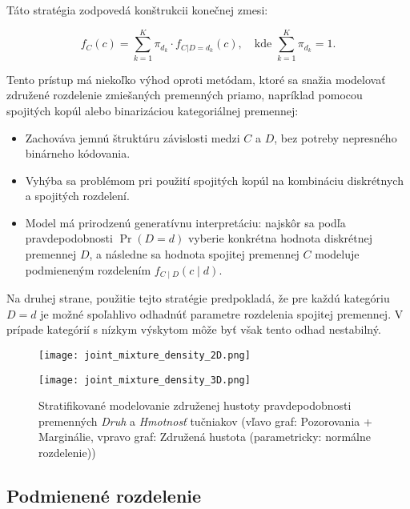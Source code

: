 Táto stratégia zodpovedá konštrukcii konečnej zmesi:

\begin{equation}
f_C(c) = \sum_{k=1}^{K} \pi_{d_k} \cdot f_{C|D=d_k}(c), \quad \text{kde } \sum_{k=1}^{K} \pi_{d_k} = 1.
\end{equation}

Tento prístup má niekoľko výhod oproti metódam, ktoré sa snažia modelovať združené rozdelenie zmiešaných premenných priamo, napríklad pomocou spojitých kopúl alebo binarizáciou kategoriálnej premennej:
\begin{itemize}
  \item Zachováva jemnú štruktúru závislosti medzi $C$ a $D$, bez potreby nepresného binárneho kódovania.
  \item Vyhýba sa problémom pri použití spojitých kopúl na kombináciu diskrétnych a spojitých rozdelení.
  \item Model má prirodzenú generatívnu interpretáciu: najskôr sa podľa pravdepodobnosti $\Pr(D = d)$ vyberie konkrétna hodnota diskrétnej premennej $D$, a následne sa hodnota spojitej premennej $C$ modeluje podmieneným rozdelením $f_{C \mid D}(c \mid d)$. 
\end{itemize}

Na druhej strane, použitie tejto stratégie predpokladá, že pre každú kategóriu $D = d$ je možné spoľahlivo odhadnúť parametre rozdelenia spojitej premennej. V prípade kategórií s nízkym výskytom môže byť však tento odhad nestabilný.

\bigskip

\begin{figure}[H]
    \centering
    \begin{minipage}[t]{0.48\linewidth}
        \centering
        \texttt{[image: joint\_mixture\_density\_2D.png]}
    \end{minipage}
    \hfill
    \begin{minipage}[t]{0.48\linewidth}
        \centering
        \texttt{[image: joint\_mixture\_density\_3D.png]}
    \end{minipage}
    \caption{Stratifikované modelovanie združenej hustoty pravdepodobnosti premenných \textit{Druh} a \textit{Hmotnosť} tučniakov (vľavo graf: Pozorovania + Marginálie, vpravo graf: Združená hustota (parametricky: normálne rozdelenie))}
    \label{fig:stratified_modelling_mix_density}
\end{figure}


\subsection{Podmienené rozdelenie}

